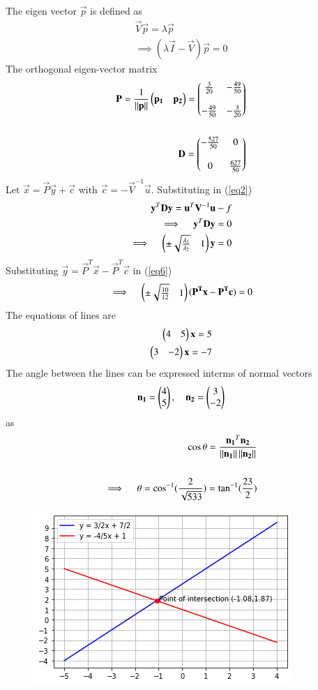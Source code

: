 \documentclass[journal,12pt,twocolumn]{IEEEtran}
\begin{document}
The eigen vector $\vec{p}$ is defined as
\begin{align}
	\vec{V}\vec{p}=\lambda\vec{p} \\
	\implies (\lambda\vec{I} - \vec{V})\vec{p}=0
\end{align}
The orthogonal eigen-vector matrix
\begin{align}
	\mathbf{P}=\frac{1}{\left\lVert\mathbf{p}\right\rVert}\begin{pmatrix}\mathbf{p_1} & \mathbf{p_2}\end{pmatrix}
	=\begin{pmatrix}\frac{3}{20} & -\frac{49}{50} \\  & \\ 
	-\frac{49}{50} & -\frac{3}{20}\end{pmatrix} \\  \nonumber \\
	\mathbf{D}=\begin{pmatrix}-\frac{527}{50} & 0 \\ & \\ 0 & \frac{627}{50}\end{pmatrix}
\end{align}
Let $\vec{x}=\vec{P}\vec{y} + \vec{c} $ with $\vec{c}=-\vec{V}^{-1}\vec{u}$. Substituting in (\ref{eq2})
\begin{align}
	\vec{y}^T\vec{D}\vec{y}=\vec{u}^T\vec{V}^{-1}\vec{u}-f \\
	\implies \quad \vec{y}^T\vec{D}\vec{y}=0 \\
	\implies \quad \myvec{\pm\sqrt{\frac{\lambda_1}{\lambda_2}} & 1}\vec{y}=0   \label{eq6}
\end{align}
Substituting $\vec{y}=\vec{P}^T\vec{x} - \vec{P}^T\vec{c}$ in (\ref{eq6}) 
\begin{align}
	\implies \quad \begin{pmatrix}\pm{\sqrt{\frac{10}{12}}} & 1\end{pmatrix}(\mathbf{\mathbf{P}^T\mathbf{x}-\mathbf{P}^T\mathbf{c}})=0 
\end{align}
The equations of lines are 
\begin{align}
	\begin{pmatrix}4 & 5\end{pmatrix}\mathbf{x} = 5 \\
	\begin{pmatrix}3 & -2\end{pmatrix}\mathbf{x} = -7 
\end{align}
The angle between the lines can be expressed interms of normal vectors 
\begin{align}
	\mathbf{n_1}=\begin{pmatrix}4\\5\end{pmatrix} , \quad \mathbf{n_2}=\begin{pmatrix}3\\-2\end{pmatrix}
\end{align}
as
\begin{align}
	\cos\theta=\frac{\mathbf{n_1}^T\mathbf{n_2}}{\left\lVert\mathbf{n_1}\right\rVert\left\lVert\mathbf{n_2}\right\rVert} \\
				\nonumber \\
	\implies \quad \theta=\cos^{-1}({\frac{2}{\sqrt{533}}}) = \tan^{-1}(\frac{23}{2})
\end{align}
\begin{figure}[!h]
	\includegraphics[width=\columnwidth]{linespart2.png}
	\caption{} \label{linefig1}
\end{figure}
\end{document}
